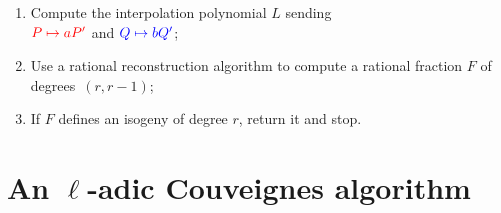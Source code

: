 \documentclass[10pt,a4paper]{beamer}
\theoremstyle{plain}
\theoremstyle{definition}
\theoremstyle{definition}
\theoremstyle{definition}
\theoremstyle{definition}
\theoremstyle{remark}
\theoremstyle{remark}
\begin{document}
\begin{frame}
\begin{enumerate}
\begin{enumerate}
  \item Compute the interpolation polynomial
    $L$ sending\\
    $\color{red}P\mapsto aP'$ and $\color{blue}Q\mapsto bQ'$;
\hfill{}
	\item Use a  rational reconstruction  algorithm 
    to compute a rational
    fraction $F$ of degrees~$(r, r-1)$;
\hfill{}
  \item If $F$ defines an isogeny of degree $r$, return it and
    stop.
  \end{enumerate}
\end{enumerate}
\end{frame}

\section{An $\ell$-adic Couveignes algorithm}
\end{document}

